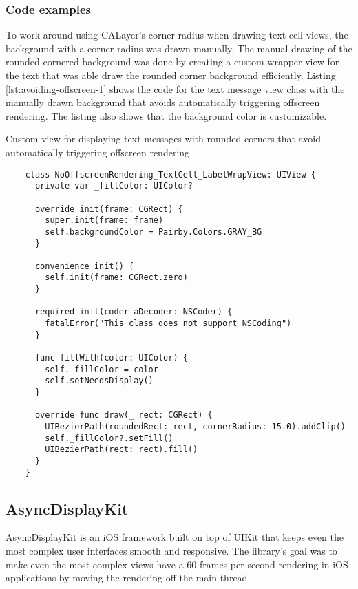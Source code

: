 \documentclass[a4paper,12pt]{article}
\begin{document}
\subsubsection{Code examples}
To work around using CALayer's corner radius when drawing text cell views, the background with a corner radius was drawn manually. The manual drawing of the rounded cornered background was done by creating a custom wrapper view for the text that was able draw the rounded corner background efficiently. Listing \ref{lst:avoiding-offscreen-1} shows the code for the text message view class with the manually drawn background that avoids automatically triggering offscreen rendering. The listing also shows that the background color is customizable.
\begin{listing}[H]
  \caption{Custom view for displaying text messages with rounded corners that avoid automatically triggering offscreen rendering}
  \label{lst:avoiding-offscreen-1}
  \begin{verbatim}
    class NoOffscreenRendering_TextCell_LabelWrapView: UIView {
      private var _fillColor: UIColor?

      override init(frame: CGRect) {
        super.init(frame: frame)
        self.backgroundColor = Pairby.Colors.GRAY_BG
      }

      convenience init() {
        self.init(frame: CGRect.zero)
      }

      required init(coder aDecoder: NSCoder) {
        fatalError("This class does not support NSCoding")
      }

      func fillWith(color: UIColor) {
        self._fillColor = color
        self.setNeedsDisplay()
      }

      override func draw(_ rect: CGRect) {
        UIBezierPath(roundedRect: rect, cornerRadius: 15.0).addClip()
        self._fillColor?.setFill()
        UIBezierPath(rect: rect).fill()
      }
    }
  \end{verbatim}
\end{listing}


\subsection{AsyncDisplayKit}
AsyncDisplayKit is an iOS framework built on top of UIKit that keeps even the most complex user interfaces smooth and responsive.\cite{IntroducingAsyncDisplayKit} The library's goal was to make even the most complex views have a 60 frames per second rendering in iOS applications by moving the rendering off the main thread.
\end{document}
